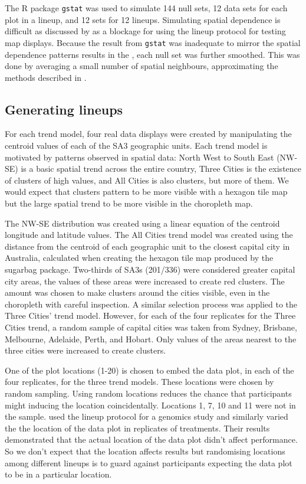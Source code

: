 \documentclass[
doublespace,
  times]{anzsauth}
\begin{document}
The R package \texttt{gstat} \citep{gstat} was used to simulate 144 null
sets, 12 data sets for each plot in a lineup, and 12 sets for 12
lineups. Simulating spatial dependence is difficult as discussed by
\citet{BDMSTW} as a blockage for using the lineup protocol for testing
map displays. Because the result from \texttt{gstat} was inadequate to
mirror the spatial dependence patterns results in the \citet{atlas},
each null set was further smoothed. This was done by averaging a small
number of spatial neighbours, approximating the methods described in
\citet{atlas-methods}.

\subsection{Generating lineups}\label{generating-lineups}

For each trend model, four real data displays were created by
manipulating the centroid values of each of the SA3 geographic units.
Each trend model is motivated by patterns observed in spatial data:
North West to South East (NW-SE) is a basic spatial trend across the
entire country, Three Cities is the existence of clusters of high
values, and All Cities is also clusters, but more of them. We would
expect that clusters pattern to be more visible with a hexagon tile map
but the large spatial trend to be more visible in the choropleth map.

The NW-SE distribution was created using a linear equation of the
centroid longitude and latitude values. The All Cities trend model was
created using the distance from the centroid of each geographic unit to
the closest capital city in Australia, calculated when creating the
hexagon tile map produced by the sugarbag \citep{sugarbag} package.
Two-thirds of SA3s (201/336) were considered greater capital city areas,
the values of these areas were increased to create red clusters. The
amount was chosen to make clusters around the cities visible, even in
the choropleth with careful inspection. A similar selection process was
applied to the Three Cities' trend model. However, for each of the four
replicates for the Three Cities trend, a random sample of capital cities
was taken from Sydney, Brisbane, Melbourne, Adelaide, Perth, and Hobart.
Only values of the areas nearest to the three cities were increased to
create clusters.

One of the plot locations (1-20) is chosen to embed the data plot, in
each of the four replicates, for the three trend models. These locations
were chosen by random sampling. Using random locations reduces the
chance that participants might inducing the location coincidentally.
Locations 1, 7, 10 and 11 were not in the sample. \citet{YMCCSG} used
the lineup protocol for a genomics study and similarly varied the the
location of the data plot in replicates of treatments. Their results
demonstrated that the actual location of the data plot didn't affect
performance. So we don't expect that the location affects results but
randomising locations among different lineups is to guard against
participants expecting the data plot to be in a particular location.
\end{document}
